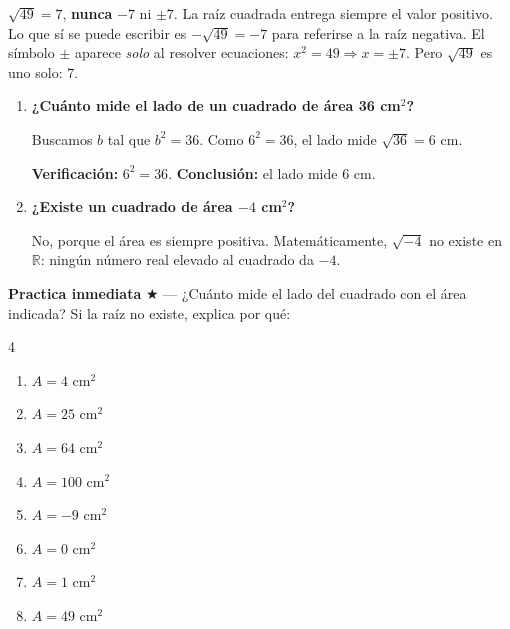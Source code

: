 \documentclass[11pt, letterpaper]{article}
\begin{document}
\begin{tcolorbox}[warningbox, title={Error frecuente — el signo de la raíz}]
$\sqrt{49}=7$, \textbf{nunca} $-7$ ni $\pm 7$. La raíz cuadrada entrega siempre el valor positivo. Lo que sí se puede escribir es $-\sqrt{49}=-7$ para referirse a la raíz negativa. El símbolo $\pm$ aparece \emph{solo} al resolver ecuaciones: $x^2=49 \Rightarrow x=\pm 7$. Pero $\sqrt{49}$ es uno solo: $7$.
\end{tcolorbox}

\begin{tcolorbox}[examplebox, title={Ejemplos — definición y existencia}]
\begin{enumerate}[label=\textbf{Ej. \arabic*.}, leftmargin=*, itemsep=12pt]

\item \textbf{¿Cuánto mide el lado de un cuadrado de área 36 cm$^2$?}

Buscamos $b$ tal que $b^2 = 36$. Como $6^2 = 36$, el lado mide $\sqrt{36} = 6$ cm.

\textbf{Verificación:} $6^2 = 36$. \checkmark \quad \textbf{Conclusión:} el lado mide $6$ cm.

\item \textbf{¿Existe un cuadrado de área $-4$ cm$^2$?}

No, porque el área es siempre positiva. Matemáticamente, $\sqrt{-4}$ no existe en $\mathbb{R}$: ningún número real elevado al cuadrado da $-4$.

\end{enumerate}
\end{tcolorbox}

\medskip
\textbf{Practica inmediata} \quad $\bigstar$ — ¿Cuánto mide el lado del cuadrado con el área indicada? Si la raíz no existe, explica por qué:
\begin{multicols}{4}
\begin{enumerate}[label=\alph*), leftmargin=*]
  \item $A = 4$ cm$^2$
  \item $A = 25$ cm$^2$
  \item $A = 64$ cm$^2$
  \item $A = 100$ cm$^2$
  \item $A = -9$ cm$^2$
  \item $A = 0$ cm$^2$
  \item $A = 1$ cm$^2$
  \item $A = 49$ cm$^2$
\end{enumerate}
\end{multicols}
\end{document}
